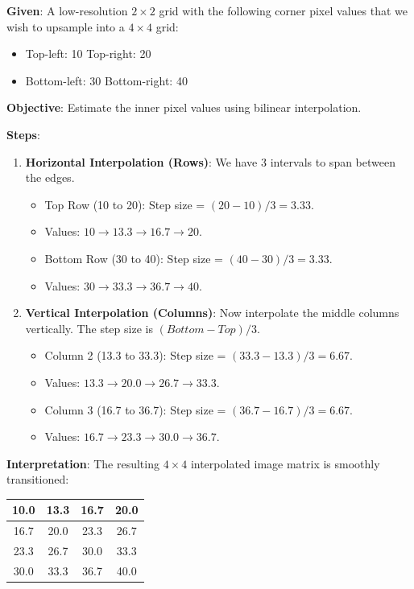 \documentclass[11pt,a4paper]{article}
\begin{document}
\begin{tcolorbox}[colback=gray!5!white,colframe=black!75!black,title=\textbf{Worked Example 14: Bilinear Interpolation (Upsampling)}]
\textbf{Given}:
A low-resolution $2 \times 2$ grid with the following corner pixel values that we wish to upsample into a $4 \times 4$ grid:
\begin{itemize}
    \item Top-left: 10 \quad Top-right: 20
    \item Bottom-left: 30 \quad Bottom-right: 40
\end{itemize}

\textbf{Objective}: Estimate the inner pixel values using bilinear interpolation.

\textbf{Steps}:
\begin{enumerate}
    \item \textbf{Horizontal Interpolation (Rows)}: We have 3 intervals to span between the edges.
    \begin{itemize}
        \item Top Row (10 to 20): Step size = $(20 - 10) / 3 = 3.33$.
        \item Values: $10 \rightarrow 13.3 \rightarrow 16.7 \rightarrow 20$.
        \item Bottom Row (30 to 40): Step size = $(40 - 30) / 3 = 3.33$.
        \item Values: $30 \rightarrow 33.3 \rightarrow 36.7 \rightarrow 40$.
    \end{itemize}

    \item \textbf{Vertical Interpolation (Columns)}: Now interpolate the middle columns vertically. The step size is $(Bottom - Top) / 3$.
    \begin{itemize}
        \item Column 2 (13.3 to 33.3): Step size = $(33.3 - 13.3) / 3 = 6.67$.
        \item Values: $13.3 \rightarrow 20.0 \rightarrow 26.7 \rightarrow 33.3$.
        \item Column 3 (16.7 to 36.7): Step size = $(36.7 - 16.7) / 3 = 6.67$.
        \item Values: $16.7 \rightarrow 23.3 \rightarrow 30.0 \rightarrow 36.7$.
    \end{itemize}
\end{enumerate}

\textbf{Interpretation}:
The resulting $4 \times 4$ interpolated image matrix is smoothly transitioned:
\begin{center}
\begin{tabular}{|c|c|c|c|}
\hline
10.0 & 13.3 & 16.7 & 20.0 \\ \hline
16.7 & 20.0 & 23.3 & 26.7 \\ \hline
23.3 & 26.7 & 30.0 & 33.3 \\ \hline
30.0 & 33.3 & 36.7 & 40.0 \\ \hline
\end{tabular}
\end{center}
\end{tcolorbox}
\end{document}

